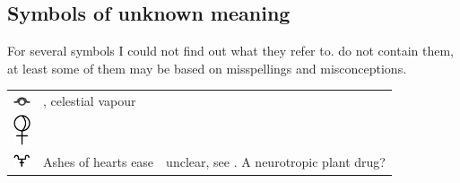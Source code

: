\documentclass[british,final,landscape]{scrartcl}
\begin{document}
\begin{refsection}
\section{Symbols of unknown meaning}

For several symbols I could not find out what they refer to. \parencite{Ant-62, Rul-12} do not contain them, at least some of them may be based on misspellings and misconceptions.

 \tablelasttail{\bottomrule}
 \begin{supertabular}{p{0.3\textwidth}p{0.34\textwidth}p{0.34\textwidth}}
   \includegraphics[width=5mm]{Unknown/AithaliOuranou} & , celestial vapour & \\
   \includegraphics[width=5mm]{Metals/ArgentumCuprofoetum} &  & \\
   \includegraphics[width=5mm]{Unknown/AshesOfHeartsEase} & Ashes of hearts ease & unclear, see \parencite{Myn-38}. A neurotropic plant drug? \\

\end{supertabular}
\end{refsection}
\end{document}
